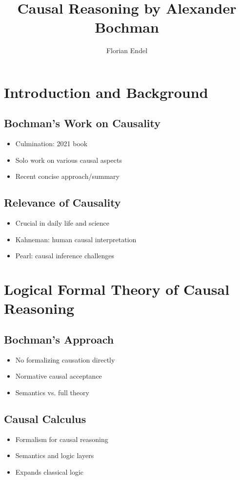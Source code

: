 \documentclass[seminar,palatino,english]{AIGpaper}
\title{Causal Reasoning by Alexander Bochman}
\author{Florian Endel}
\begin{document}
\maketitle %


\section{Introduction and Background}
\subsection{Bochman's Work on Causality}
\begin{itemize}
    \item Culmination: 2021 book \cite{bochman_logical_2021}
    \item Solo work on various causal aspects
    \item Recent concise approach/summary \cite{bochman_causal_2024}
\end{itemize}
\subsection{Relevance of Causality}
\begin{itemize}
    \item Crucial in daily life and science
    \item Kahneman: human causal interpretation
    \item Pearl: causal inference challenges
\end{itemize}

\section{Logical Formal Theory of Causal Reasoning}
\subsection{Bochman's Approach}
\begin{itemize}
    \item No formalizing causation directly
    \item Normative causal acceptance
    \item Semantics vs. full theory
\end{itemize}

\subsection{Causal Calculus}
\begin{itemize}
    \item Formalism for causal reasoning
        \item Semantics and logic layers
    \item Expands classical logic
\end{itemize}
\end{document}
